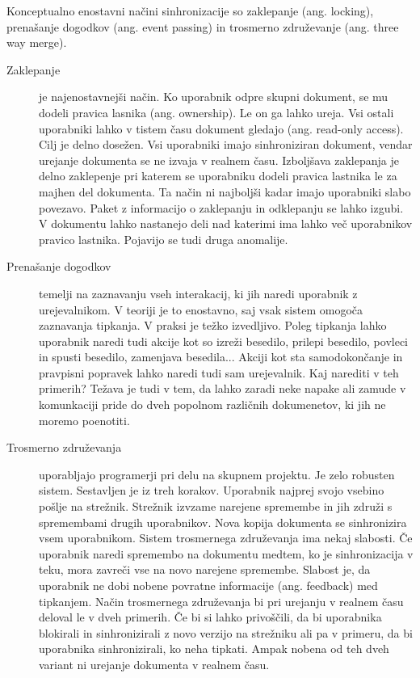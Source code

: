 \documentclass[a4paper, 12pt, twoside]{book}
\begin{document}
Konceptualno enostavni načini sinhronizacije so zaklepanje (ang. locking), prenašanje dogodkov (ang. event passing) in trosmerno združevanje (ang. three way merge).

\begin{description}
	\item[Zaklepanje] je najenostavnejši način. Ko uporabnik odpre skupni dokument, se mu dodeli pravica lasnika (ang. ownership). Le on ga lahko ureja. Vsi ostali uporabniki lahko v tistem času dokument gledajo (ang. read-only access). Cilj je delno dosežen. Vsi uporabniki imajo sinhroniziran dokument, vendar urejanje dokumenta se ne izvaja v realnem času. Izboljšava zaklepanja je delno zaklepenje pri katerem se uporabniku dodeli pravica lastnika le za majhen del dokumenta. Ta način ni najboljši kadar imajo uporabniki slabo povezavo. Paket z informacijo o zaklepanju in odklepanju se lahko izgubi. V dokumentu lahko nastanejo deli nad katerimi ima lahko več uporabnikov pravico lastnika. Pojavijo se tudi druga anomalije.
	\item[Prenašanje dogodkov] temelji na zaznavanju vseh interakacij, ki jih naredi uporabnik z urejevalnikom. V teoriji je to enostavno, saj vsak sistem omogoča zaznavanja tipkanja. V praksi je težko izvedljivo. Poleg tipkanja lahko uporabnik naredi tudi akcije kot so izreži besedilo, prilepi besedilo, povleci in spusti besedilo, zamenjava besedila... Akciji kot sta samodokončanje in pravpisni popravek lahko naredi tudi sam urejevalnik. Kaj narediti v teh primerih? Težava je tudi v tem, da lahko zaradi neke napake ali zamude v komunkaciji pride do dveh popolnom različnih dokumenetov, ki jih ne moremo poenotiti.
	\item[Trosmerno združevanja] uporabljajo programerji pri delu na skupnem projektu. Je zelo robusten sistem. Sestavljen je iz treh korakov. Uporabnik najprej svojo vsebino pošlje na strežnik. Strežnik izvzame narejene spremembe in jih združi s spremembami drugih uporabnikov. Nova kopija dokumenta se sinhronizira vsem uporabnikom. Sistem trosmernega združevanja ima nekaj slabosti. Če uporabnik naredi spremembo na dokumentu medtem, ko je sinhronizacija v teku, mora zavreči vse na novo narejene spremembe. Slabost je, da uporabnik ne dobi nobene povratne informacije (ang. feedback) med tipkanjem. Način trosmernega združevanja bi pri urejanju v realnem času deloval le v dveh primerih. Če bi si lahko privoščili, da bi uporabnika blokirali in sinhronizirali z novo verzijo na strežniku ali pa v primeru, da bi uporabnika sinhronizirali, ko neha tipkati. Ampak nobena od teh dveh variant ni urejanje dokumenta v realnem času.
\end{description}
\end{document}
